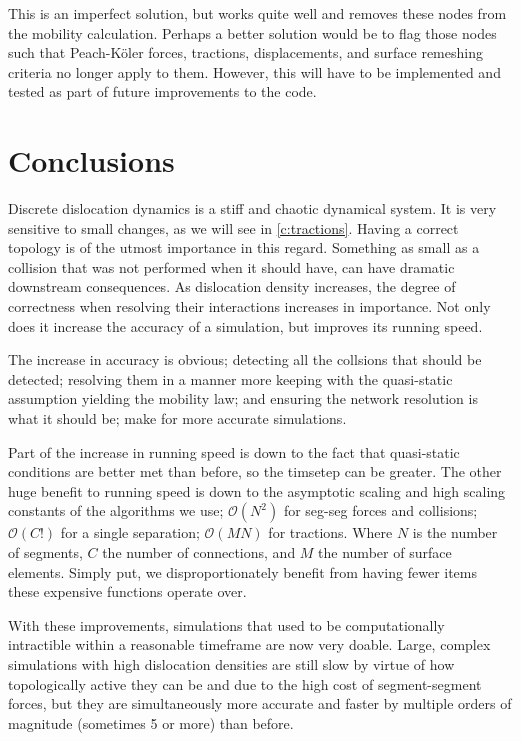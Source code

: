 This is an imperfect solution, but works quite well and removes these nodes from the mobility calculation. Perhaps a better solution would be to flag those nodes such that Peach-K\"{o}ler forces, tractions, displacements, and surface remeshing criteria no longer apply to them. However, this will have to be implemented and tested as part of future improvements to the code.

\section{Conclusions}

Discrete dislocation dynamics is a stiff and chaotic dynamical system. It is very sensitive to small changes, as we will see in \cref{c:tractions}. Having a correct topology is of the utmost importance in this regard. Something as small as a collision that was not performed when it should have, can have dramatic downstream consequences. As dislocation density increases, the degree of correctness when resolving their interactions increases in importance. Not only does it increase the accuracy of a simulation, but improves its running speed.

The increase in accuracy is obvious; detecting all the collsions that should be detected; resolving them in a manner more keeping with the quasi-static assumption yielding the mobility law; and ensuring the network resolution is what it should be; make for more accurate simulations.

Part of the increase in running speed is down to the fact that quasi-static conditions are better met than before, so the timsetep can be greater. The other huge benefit to running speed is down to the asymptotic scaling and high scaling constants of the algorithms we use; $\mathcal{O}(N^2)$ for seg-seg forces and collisions; $\mathcal{O}(C!)$ for a single separation; $\mathcal{O}(M N)$ for tractions. Where $N$ is the number of segments, $C$ the number of connections, and $M$ the number of surface elements. Simply put, we disproportionately benefit from having fewer items these expensive functions operate over.

With these improvements, simulations that used to be computationally intractible within a reasonable timeframe are now very doable. Large, complex simulations with high dislocation densities are still slow by virtue of how topologically active they can be and due to the high cost of segment-segment forces, but they are simultaneously more accurate and faster by multiple orders of magnitude (sometimes 5 or more) than before.
\savearabiccounter
